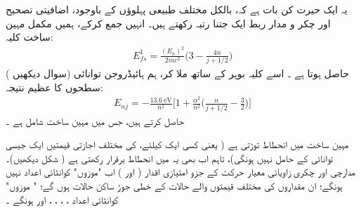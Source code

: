 یہ ایک حیرت کن بات ہے کہ،  بالکل مختلف طبیعی پہلوؤں کے باوجود،  اضافیتی تصحیح اور چکر و  مدار ربط ایک جتنا رتبہ  رکھتے ہیں۔ انہیں جمع کرکے،  ہمیں مکمل مہین ساخت  کلیہ:
\begin{align}\label{مساوات_غیر_مضطرب_اضافیتی_تصحیح_چکرومدار_ربط}
E_{fs}^1 = \frac{(E_n)^2}{2mc^2} \big ( 3 - \frac{4n}{j + 1/2} \big )
\end{align}
 ( سوال  دیکھیں)   حاصل ہوتا ہے ۔ اسے  کلیہ بوہر کے ساتھ ملا  کر،  ہم ہائیڈروجن  توانائی سطحوں کا عظیم نتیجہ:
\begin{align}\label{مساوات_غیر_مضطرب_مجموعی_نتیجہ_مہین}
E_{nj} = - \frac{\SI{13.6}{\electronvolt}}{n^2} \big [ 1 + \frac{\alpha^2}{n^2} \big ( \frac{n}{j + 1/2} - \frac{3}{2} \big ) \big ]
\end{align}
حاصل کرتے ہیں، جس میں مہین ساخت شامل ہے ۔ 

مہین ساخت  میں انحطاط  توڑتی ہے ( یعنی کسی ایک  کیلئے،   کی مختلف اجازتی قیمتیں ایک  جیسی توانائی کے حامل نہیں ہونگی)،  تاہم اب بھی یہ  میں انحطاط  برقرار رکھتی  ہے ( شکل   دیکھیں)۔ مدارچی  اور چکری  زاویائی معیار حرکت  کے  جزو امتیازی اقدار (  اور )  اب "موزوں" کوانٹائی  اعداد نہیں ہونگے؛  ان مقداروں کی مختلف قیمتوں والے حالات کے خطی جوڑ ساکن حالات ہوں گے؛ " ‏موزوں" کوانٹائی  اعداد ، ، ، ، اور  ہونگے ۔

